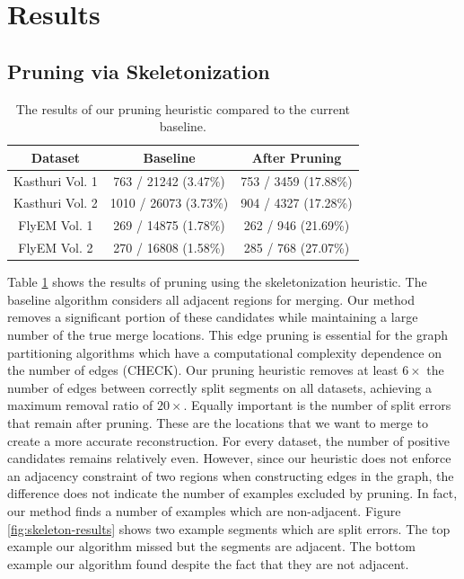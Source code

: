 \section{Results}

\subsection{Pruning via Skeletonization}

\begin{table}
	\centering
	\small
	\begin{tabular}{c c c} \hline
		\textbf{Dataset} & \textbf{Baseline} & \textbf{After Pruning} \\ \hline
		Kasthuri Vol. 1 & 763 / 21242 (3.47\%) & 753 / 3459 (17.88\%) \\
		Kasthuri Vol. 2 & 1010 / 26073 (3.73\%) & 904 / 4327 (17.28\%) \\
		FlyEM Vol. 1 & 269 / 14875 (1.78\%) & 262 / 946 (21.69\%) \\
		FlyEM Vol. 2 & 270 / 16808 (1.58\%) & 285 / 768 (27.07\%)\\ \hline
	\end{tabular}
	\caption{The results of our pruning heuristic compared to the current baseline.}
	\label{table:skeletonization}
\end{table}

Table \ref{table:skeletonization} shows the results of pruning using the skeletonization heuristic.
The baseline algorithm considers all adjacent regions for merging. 
Our method removes a significant portion of these candidates while maintaining a large number of the true merge locations.
This edge pruning is essential for the graph partitioning algorithms which have a computational complexity dependence on the number of edges (CHECK). 
Our pruning heuristic removes at least $6\times$ the number of edges between correctly split segments on all datasets, achieving a maximum removal ratio of $20\times$. 
Equally important is the number of split errors that remain after pruning.
These are the locations that we want to merge to create a more accurate reconstruction.
For every dataset, the number of positive candidates remains relatively even. 
However, since our heuristic does not enforce an adjacency constraint of two regions when constructing edges in the graph, the difference does not indicate the number of examples excluded by pruning. 
In fact, our method finds a number of examples which are non-adjacent.
Figure \ref{fig:skeleton-results} shows two example segments which are split errors.
The top example our algorithm missed but the segments are adjacent. 
The bottom example our algorithm found despite the fact that they are not adjacent.

